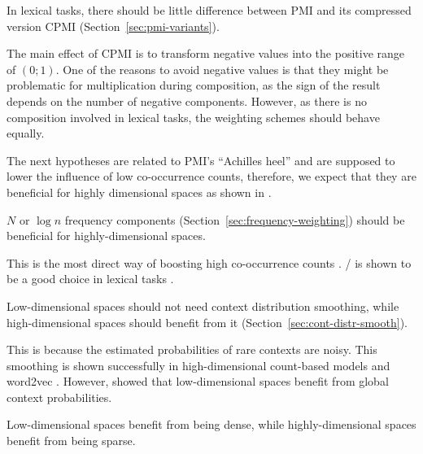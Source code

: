 \begin{hyp}
  \label{hyp:lex-pmi-cpmi}
  In lexical tasks, there should be little difference between PMI and its compressed version CPMI (Section~\ref{sec:pmi-variants}).
\end{hyp}

The main effect of CPMI is to transform negative values into the positive range of $(0; 1)$. One of the reasons to avoid negative values is that they might be problematic for multiplication during composition, as the sign of the result depends on the number of negative components. However, as there is no composition involved in lexical tasks, the weighting schemes should behave equally.

The next hypotheses are related to PMI's ``Achilles heel'' and are supposed to lower the influence of low co-occurrence counts, therefore, we expect that they are beneficial for highly dimensional spaces as shown in .

\begin{hyp}
  \label{hyp:freq}
 $N$ or $\log n$ frequency components (Section~\ref{sec:frequency-weighting}) should be beneficial for highly-dimensional spaces.
\end{hyp}

This is the most direct way of boosting high co-occurrence counts \cite{Evert05}. \NPMI/ is shown to be a good choice in lexical tasks \cite{Bruni:2012:DST:2390524.2390544}.

\begin{hyp}
  \label{hyp:cds}
  Low-dimensional spaces should not need context distribution smoothing, while high-dimensional spaces should benefit from it (Section~\ref{sec:cont-distr-smooth}).
\end{hyp}

This is because the estimated probabilities of rare contexts are noisy. This smoothing is shown successfully in high-dimensional count-based models \cite{TACL570} and word2vec \cite{mikolov2013efficient}. However,  showed that low-dimensional spaces benefit from global context probabilities.

\begin{hyp}
  \label{hyp:neg}
  Low-dimensional spaces benefit from being dense, while highly-dimensional spaces benefit from being sparse.
\end{hyp}

